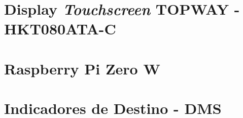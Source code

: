 \label{cap:RevisaoDeLiteratura}
\section{Display \textit{Touchscreen} TOPWAY - HKT080ATA-C}
	
	
\section{Raspberry Pi Zero W}
	

\section{Indicadores de Destino - DMS}
	